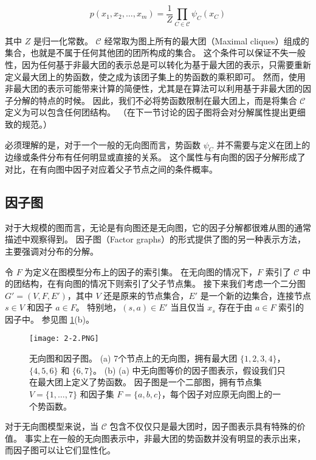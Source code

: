 \begin{equation}
    p(x_1, x_2, \dots, x_m) = \frac{1}{Z}\prod_{C \in \mathcal{C}}\psi_C(x_C)
\end{equation}

其中 $Z$ 是归一化常数。
$\mathcal{C}$ 经常取为图上所有的最大团（Maximal cliques）组成的集合，也就是不属于任何其他团的团所构成的集合。
这个条件可以保证不失一般性，因为任何基于非最大团的表示总是可以转化为基于最大团的表示，只需要重新定义最大团上的势函数，使之成为该团子集上的势函数的乘积即可。
然而，使用非最大团的表示可能带来计算的简便性，尤其是在算法可以利用基于非最大团的因子分解的特点的时候。
因此，我们不必将势函数限制在最大团上，而是将集合 $\mathcal{C}$ 定义为可以包含任何团结构。
（在下一节讨论的因子图将会对分解属性提出更细致的规范。）

必须理解的是，对于一个一般的无向图而言，势函数 $\psi_C$ 并不需要与定义在团上的边缘或条件分布有任何明显或直接的关系。
这个属性与有向图的因子分解形成了对比，在有向图中因子对应着父子节点之间的条件概率。

\subsection{因子图}

对于大规模的图而言，无论是有向图还是无向图，它的因子分解都很难从图的通常描述中观察得到。
因子图（Factor graphs）的形式提供了图的另一种表示方法，主要强调对分布的分解。

令 $F$ 为定义在图模型分布上的因子的索引集。
在无向图的情况下，$F$ 索引了 $\mathcal{C}$ 中的团结构，在有向图的情况下则索引了父子节点集。
接下来我们考虑一个二分图 $G' = (V, F, E')$，其中 $V$ 还是原来的节点集合，$E'$ 是一个新的边集合，连接节点 $s \in V$ 和因子 $a \in F$。
特别地，$(s, a) \in E'$ 当且仅当 $x_s$ 存在于由 $a \in F$ 索引的因子中。
参见图 \ref{fig:2-2}(b)。

\begin{figure}[htbp]
    \centering
    \texttt{[image: 2-2.PNG]}
    \caption{
        无向图和因子图。
        (a) 7个节点上的无向图，拥有最大团 $\{1, 2, 3, 4\}$，$\{4, 5, 6\}$ 和 $\{6, 7\}$。
        (b) (a) 中无向图等价的因子图表示，假设我们只在最大团上定义了势函数。
        因子图是一个二部图，拥有节点集 $V = \{1, \dots, 7\}$ 和因子集 $F = \{a, b, c\}$，每个因子对应原无向图上的一个势函数。
    }\label{fig:2-2}
\end{figure}

对于无向图模型来说，当 $\mathcal{C}$ 包含不仅仅只是最大团时，因子图表示具有特殊的价值。
事实上在一般的无向图表示中，非最大团的势函数并没有明显的表示出来，而因子图可以让它们显性化。

